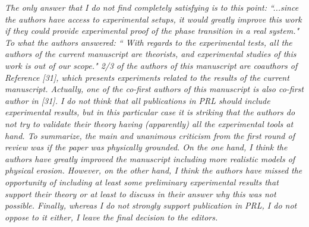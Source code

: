 \documentclass{article}
\newcommand{\Question}[1]{\noindent \color{black}\emph{#1}\normalcolor}
\newcommand{\Answer}[1]{\noindent {\color{blue}{ #1}}\normalcolor}
\begin{document}
\Question{
The only answer that I do not find completely satisfying is to this
point: ``...since the authors have access to experimental setups, it
would greatly improve this work if they could provide experimental
proof of the phase transition in a real system." To what the authors
answered: `` With regards to the experimental tests, all the authors of
the current manuscript are theorists, and experimental studies of this
work is out of our scope." 2/3 of the authors of this manuscript are coauthors of Reference [31],
which presents experiments related to the results of the current
manuscript. Actually, one of the co-first authors of this manuscript
is also co-first author in [31]. I do not think that all publications
in PRL should include experimental results, but in this particular
case it is striking that the authors do not try to validate their
theory having (apparently) all the experimental tools at hand.
\newline
To summarize, the main and unanimous criticism from the first round of
review was if the paper was physically grounded. On the one hand, I
think the authors have greatly improved the manuscript including more
realistic models of physical erosion. However, on the other hand, I
think the authors have missed the opportunity of including at least
some preliminary experimental results that support their theory or at
least to discuss in their answer why this was not possible.
\newline
Finally, whereas I do not strongly support publication in PRL, I do
not oppose to it either, I leave the final decision to the editors.
\newline}

\Answer{We thank the referee for appreciating the more realistic physical
models utilized in the revised version and the extended theoretical
framework we used.
With regards to the question about the potential experimental tests of
the theory:
We completely agree with the referee that performing experiments to
test our theory is important. Unfortunately performing them is
currently unfeasible for us, since the Amir group is a theory group
and has no lab space.
We would like to make some clarifications with regards to Ref. [31].
In this work Dr. Shima Parsa, then a postdoc in the Weitz lab, had
empirical observations relating the mean velocity and permeability as
flow in a porous material is clogged with a polymer. Dr. Ahmad Zareei,
working under the guidance of Prof. Ariel Amir, set out to explain the
observed scaling using a combination of numerical simulations and
analytical work, which led to a joint publication (Ref. [31] mentioned
by the referee). Note that the experiments were performed by Dr. Parsa
over the course of several years while she was at Harvard. Dr. Parsa
has recently started as faculty at the Rochester Institute of
Technology, and therefore the experimental system associated with Ref.
[31] is no longer active at Harvard. We hope that as Referee D mentioned our theoretical study will trigger further experimental work in the future.}
\end{document}

